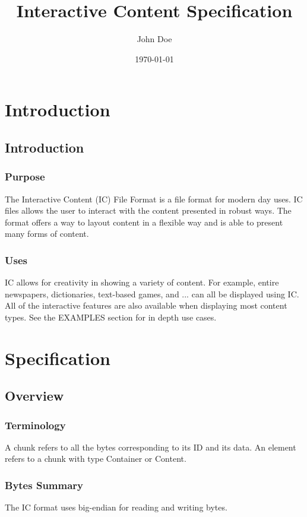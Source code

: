 \documentclass{report}
\title{Interactive Content Specification}
\author{John Doe}
\date{\today}
\begin{document}
\maketitle

\tableofcontents

\part{Introduction}

\chapter{Introduction}

\section{Purpose}
The Interactive Content (IC) File Format is a file format for modern day uses. 
IC files allows the user to interact with the content presented in robust ways.
The format offers a way to layout content in a flexible way and is able to present many forms of content.

\section{Uses}
IC allows for creativity in showing a variety of content. For example, entire newspapers, dictionaries, text-based games, and ... can all be displayed using IC. All of the interactive features are also available when displaying most content types. See the EXAMPLES section for in depth use cases.

\part{Specification}

\chapter{Overview}
\section{Terminology}
A chunk refers to all the bytes corresponding to its ID and its data.
An element refers to a chunk with type Container or Content.

\section{Bytes Summary}
The IC format uses big-endian for reading and writing bytes. 
\end{document}
